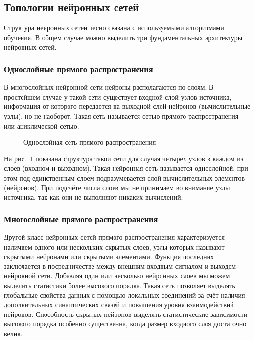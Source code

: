 \subsection{Топологии нейронных сетей}

Структура нейронных сетей тесно связана с используемыми алгоритмами обучения.
В общем случае можно выделить три фундаментальных архитектуры нейронных сетей.

\subsubsection{Однослойные прямого распространения}

В многослойных нейронной сети нейроны располагаются по слоям.
В простейшем случае у такой сети существует входной слой узлов источника, информация от которого передается на выходной слой нейронов (вычислительные узлы), но не наоборот. 
Такая сеть называется сетью прямого распространения или ациклической сетью.
\begin{figure}[h]
\caption{Однослойная сеть прямого распространения}
\label{ris:OneLayer}
\end{figure}

На рис.~\ref{ris:OneLayer} показана структура такой сети для случая четырёх узлов в каждом из слоев (входном и выходном).
Такая нейронная сеть называется однослойной, при этом под единственным слоем подразумевается слой вычислительных элементов (нейронов).
При подсчёте числа слоев мы не принимаем во внимание узлы источника, так как они не выполняют никаких вычислений.\cite{NejronnyeSeti}

\subsubsection{Многослойные прямого распространения}

Другой класс нейронных сетей прямого распространения  характеризуется наличием одного или нескольких скрытых слоев, узлы которых называют скрытыми нейронами или скрытыми элементами.
Функция последних заключается в посредничестве между внешним входным сигналом и выходом нейронной сети.
Добавляя один или несколько нейронных слоев мы можем выделить статистики более высокого порядка.
Такая сеть позволяет выделять глобальные свойства данных с помощью локальных соединений за счёт наличия дополнительных синаптических связей  и повышения уровня взаимодействий нейронов.
Способность скрытых нейронов выделять статистические зависимости высокого порядка особенно существенна, когда размер входного слоя достаточно велик.

